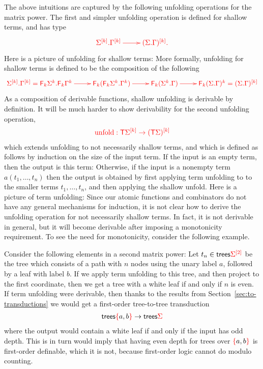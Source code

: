 The above intuitions are captured by the following unfolding operations for the matrix power. The first and simpler unfolding operation is defined for shallow terms, and has type
\begin{align*}
    \ranked{
        \xymatrix{
            \shallowterm{\mati k \rSigma} {\mati k \rGamma}  \ar[r] & \mati k {(\shallowterm \Sigma \Gamma)}.
        }
    }
\end{align*}
Here is a picture of unfolding for shallow terms:
More formally, unfolding for shallow terms is defined to be   the composition of the following
\begin{align*}
\ranked{
    \xymatrix{
        \shallowterm{\mati k \rSigma} {\mati k \rGamma} = {\shallowterm{\reduce k {\Sigma^k}}{\reduce k {\Gamma^k}}} \ar[r] &
        \reduce k(\shallowterm{\reduce k {\Sigma^k}}{ {\Gamma^k}}) \ar[r] &
        \reduce k(\shallowterm{\Sigma^k}{ {\Gamma}}) \ar[r] &
        \reduce k(\shallowterm{\Sigma}{ {\Gamma}})^k = \mati k {(\shallowterm \Sigma \Gamma)}
    }
}
\end{align*}
As a composition of derivable functions, shallow unfolding is derivable by definition.  It will be much harder to show derivability for the second unfolding operation, 
\begin{align*}
    \ranked{\unfold : \tmonad \mati k \rSigma \to \mati k {(\tmonad \Sigma)} }
    \end{align*}
    which extends unfolding to  not necessarily shallow terms, and which is
defined as follows by induction on the size of the input term. If the input is an empty term, then the output is this term:
Otherwise, if the input is a nonempty term $a(t_1,\ldots,t_n)$ then the output is obtained by first applying term unfolding to to the smaller terms $t_1,\ldots,t_n$, and then applying the shallow unfold. Here is a picture of term unfolding: 
Since our atomic functions and combinators do not have any general mechanisms for induction, it is not clear how to derive the unfolding operation for not necessarily shallow terms. In fact, it is not derivable in general, but it will become derivable after imposing a monotonicity requirement.   To see the need for monotonicity, consider the following example.
\begin{example}\label{eq:twist}
    Consider the following elements in a second matrix power:
Let $t_n \in \trees \mati 2 \rSigma$ be the tree which consists of a path with $n$ nodes using the unary label $a$, followed by a leaf with label $b$. If we apply term unfolding to this tree, and then project to the first coordinate, then we get a tree with a white leaf if and only if  $n$ is even.  If term unfolding were derivable, then thanks to the results from Section~\ref{sec:to-transductions}  we would get a first-order tree-to-tree transduction 
\begin{align*}
\trees \redset{a,b} \to \trees \rSigma
\end{align*}
where the output would contain a white leaf if and only if the input has odd depth. This is in turn would imply that having even depth for trees over $\redset{a,b}$ is first-order definable, which it is not, because first-order logic cannot do modulo counting.
\end{example}

